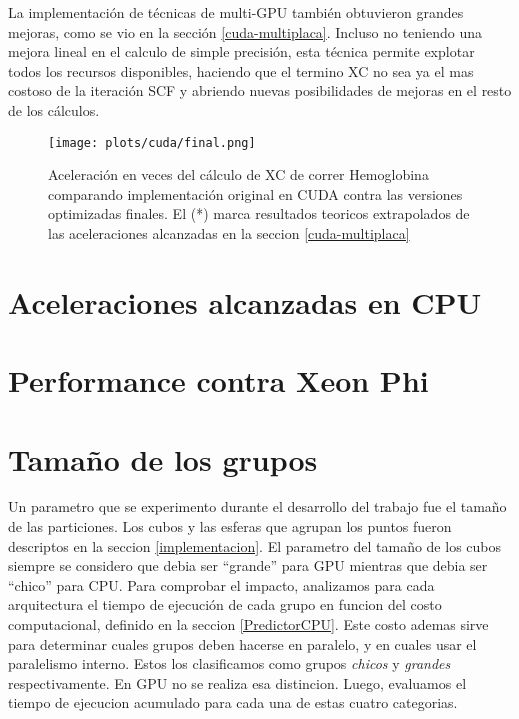 La implementaci\'on de t\'ecnicas de multi-GPU tambi\'en obtuvieron grandes mejoras, como se vio en la
secci\'on \ref{cuda-multiplaca}. Incluso no teniendo una mejora lineal en el calculo de simple
precisi\'on, esta t\'ecnica permite explotar todos los recursos disponibles, haciendo que el termino
XC no sea ya el mas costoso de la iteraci\'on SCF y abriendo nuevas posibilidades de mejoras en el
resto de los c\'alculos.

\begin{figure}[htbp]
   \centering
   \texttt{[image: plots/cuda/final.png]}
   \caption{Aceleraci\'on en veces del c\'alculo de XC de correr Hemoglobina comparando implementaci\'on original en CUDA contra
   las versiones optimizadas finales. El (*) marca resultados teoricos extrapolados de las
 aceleraciones alcanzadas en la seccion \ref{cuda-multiplaca}}
   \label{fig:cuda-final}
\end{figure}


\section{Aceleraciones alcanzadas en CPU}

\section{Performance contra Xeon Phi}

\section{Tama\~no de los grupos}
\label{tamgrupos}
Un parametro que se experimento durante el desarrollo del trabajo fue el tamaño de las particiones.
Los cubos y las esferas que agrupan los puntos fueron descriptos en la seccion \ref{implementacion}. El parametro
del tama\~no de los cubos siempre se considero que debia ser ``grande'' para GPU mientras que debia ser
``chico'' para CPU. Para comprobar el impacto, analizamos para cada arquitectura el tiempo de ejecuci\'on
de cada grupo en funcion del costo computacional, definido en la seccion \ref{PredictorCPU}. Este costo ademas
sirve para determinar cuales grupos deben hacerse en paralelo, y en cuales usar el paralelismo interno. Estos
los clasificamos como grupos \textit{chicos} y \textit{grandes} respectivamente. En GPU no se realiza esa
distincion. Luego, evaluamos el tiempo de ejecucion acumulado para cada una de estas cuatro categorias.


